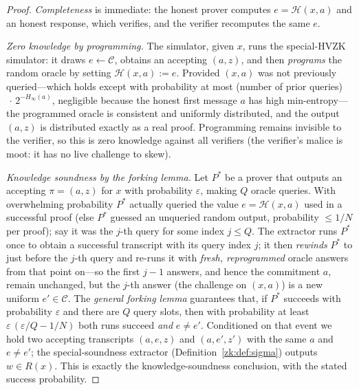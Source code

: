 \documentclass[11pt,a4paper]{article}
\theoremstyle{definition}
\theoremstyle{remark}
\begin{document}
\begin{proof}
\emph{Completeness} is immediate: the honest prover computes \(e = \mathcal{H}(x,a)\) and an honest response, which verifies, and the verifier recomputes the same \(e\).

\emph{Zero knowledge by programming.} The simulator, given \(x\), runs the special-HVZK simulator: it draws \(e \leftarrow \mathcal{C}\), obtains an accepting \((a, z)\), and then \emph{programs} the random oracle by setting \(\mathcal{H}(x, a) := e\). Provided \((x,a)\) was not previously queried---which holds except with probability at most (number of prior queries)\(\,\cdot\, 2^{-H_\infty(a)}\), negligible because the honest first message \(a\) has high min-entropy---the programmed oracle is consistent and uniformly distributed, and the output \((a, z)\) is distributed exactly as a real proof. Programming remains invisible to the verifier, so this is zero knowledge against all verifiers (the verifier's malice is moot: it has no live challenge to skew).

\emph{Knowledge soundness by the forking lemma.} Let \(P^*\) be a prover that outputs an accepting \(\pi = (a, z)\) for \(x\) with probability \(\varepsilon\), making \(Q\) oracle queries. With overwhelming probability \(P^*\) actually queried the value \(e = \mathcal{H}(x, a)\) used in a successful proof (else \(P^*\) guessed an unqueried random output, probability \(\le 1/N\) per proof); say it was the \(j\)-th query for some index \(j \le Q\). The extractor runs \(P^*\) once to obtain a successful transcript with its query index \(j\); it then \emph{rewinds} \(P^*\) to just before the \(j\)-th query and re-runs it with \emph{fresh, reprogrammed} oracle answers from that point on---so the first \(j-1\) answers, and hence the commitment \(a\), remain unchanged, but the \(j\)-th answer (the challenge on \((x,a)\)) is a new uniform \(e' \in \mathcal{C}\). The \emph{general forking lemma} guarantees that, if \(P^*\) succeeds with probability \(\varepsilon\) and there are \(Q\) query slots, then with probability at least \(\varepsilon\,(\varepsilon/Q - 1/N)\) both runs succeed \emph{and} \(e \ne e'\). Conditioned on that event we hold two accepting transcripts \((a, e, z)\) and \((a, e', z')\) with the same \(a\) and \(e \ne e'\); the special-soundness extractor (Definition~\ref{zk:def:sigma}) outputs \(w \in R(x)\). This is exactly the knowledge-soundness conclusion, with the stated success probability.
\end{proof}
\end{document}
